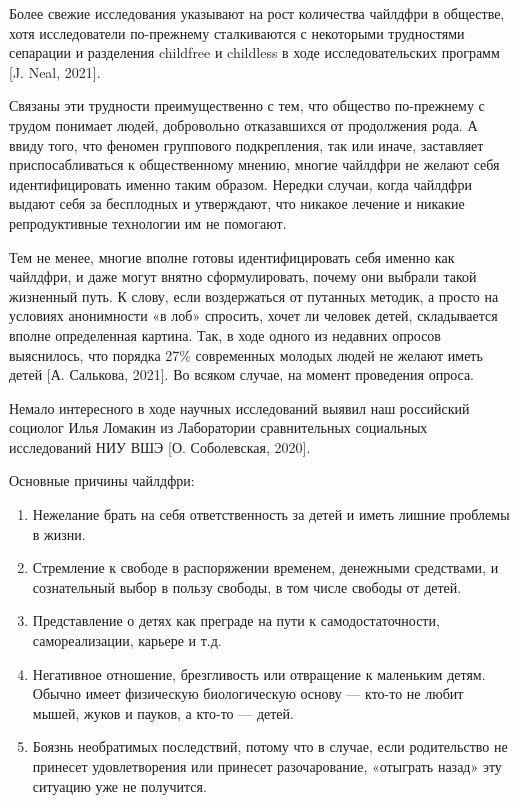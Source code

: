Более свежие исследования указывают на рост количества чайлдфри в обществе, хотя исследователи по-прежнему сталкиваются с некоторыми трудностями сепарации и разделения childfree и childless в ходе исследовательских программ [J. Neal, 2021].

Связаны эти трудности преимущественно с тем, что общество по-прежнему с трудом понимает людей, добровольно отказавшихся от продолжения рода. А ввиду того, что феномен группового подкрепления, так или иначе, заставляет приспосабливаться к общественному мнению, многие чайлдфри не желают себя идентифицировать именно таким образом. Нередки случаи, когда чайлдфри выдают себя за бесплодных и утверждают, что никакое лечение и никакие репродуктивные технологии им не помогают.

Тем не менее, многие вполне готовы идентифицировать себя именно как чайлдфри, и даже могут внятно сформулировать, почему они выбрали такой жизненный путь. К слову, если воздержаться от путанных методик, а просто на условиях анонимности «в лоб» спросить, хочет ли человек детей, складывается вполне определенная картина. Так, в ходе одного из недавних опросов выяснилось, что порядка 27\% современных молодых людей не желают иметь детей [А. Салькова, 2021]. Во всяком случае, на момент проведения опроса.

Немало интересного в ходе научных исследований выявил наш российский социолог Илья Ломакин из Лаборатории сравнительных социальных исследований НИУ ВШЭ [О. Соболевская, 2020].

Основные причины чайлдфри:
\begin{enumerate}
    \item Нежелание брать на себя ответственность за детей и иметь лишние проблемы в жизни.
    \item Стремление к свободе в распоряжении временем, денежными средствами, и сознательный выбор в пользу свободы, в том числе свободы от детей.
    \item Представление о детях как преграде на пути к самодостаточности, самореализации, карьере и т.д.
    \item Негативное отношение, брезгливость или отвращение к маленьким детям. Обычно имеет физическую биологическую основу --- кто-то не любит мышей, жуков и пауков, а кто-то --- детей.
    \item Боязнь необратимых последствий, потому что в случае, если родительство не принесет удовлетворения или принесет разочарование, «отыграть назад» эту ситуацию уже не получится.
\end{enumerate}

